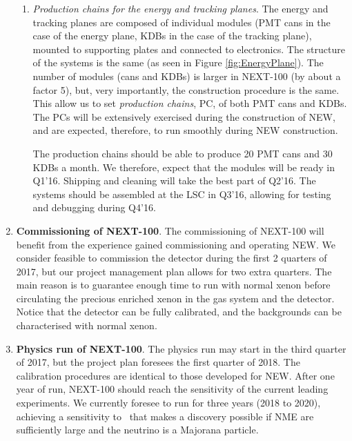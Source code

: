 \begin{enumerate}
\begin{enumerate}
\item {\em Production chains for the energy and tracking planes}. The energy and tracking planes are composed of individual modules (PMT cans in the case of the energy plane, KDBs in the case of the tracking plane), mounted to supporting plates and connected to electronics. The structure of the systems is the same (as seen in Figure \ref{fig:EnergyPlane}). The number of modules (cans and KDBs) is larger in NEXT-100 (by about a factor 5), but, very importantly, the construction procedure is the same. This allow us to set {\em production chains}, PC, of both PMT cans and KDBs. The PCs will be extensively exercised during the construction of NEW, and are expected, therefore, to run smoothly during NEW construction.  

The production chains should be able to produce 20 PMT cans and 30 KDBs a month. We therefore, expect that the modules will be ready in Q1'16. Shipping and cleaning will take the best part of Q2'16. The systems should be assembled at the LSC in Q3'16, allowing for testing and debugging during Q4'16.
\end{enumerate}

\item {\bf Commissioning of NEXT-100}. The commissioning of NEXT-100 will benefit from the experience gained commissioning and operating NEW. We consider feasible to commission the detector during the first 2 quarters of 2017, but our project management plan allows for two extra quarters. The main reason is to guarantee enough time to run with normal xenon before circulating the precious enriched xenon in the gas system and the detector. Notice that the detector can be fully calibrated, and the backgrounds can be characterised with normal xenon.  

\item {\bf Physics run of NEXT-100}. The physics run may start in the third quarter of 2017, but the project plan foresees the first quarter of 2018. The calibration procedures are identical to those developed for NEW. After one year of run, NEXT-100 should reach the sensitivity of the current leading experiments. We currently foresee to run for three years (2018 to 2020), achieving a sensitivity to \mbb\ that makes a discovery possible if NME are sufficiently large and the neutrino is a Majorana particle. 

\end{enumerate}
